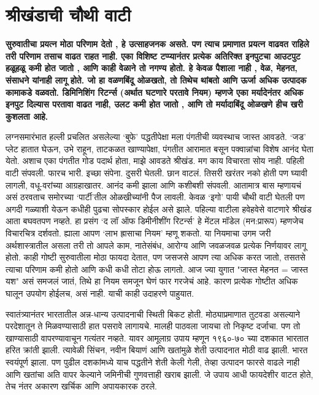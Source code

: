 \chapter{श्रीखंडाची चौथी वाटी}

\textcolor{blue!60!black}{\textbf{सुरुवातीचा प्रयत्न मोठा परिणाम देतो , हे उत्साहजनक असते. पण त्याच प्रमाणात प्रयत्न वाढवत राहिले तरी परिणाम तसाच वाढत राहत नाही. एका विशिष्ट टप्प्यानंतर प्रत्येक अतिरिक्त इनपुटचा आउटपुट हळूहळू कमी होत जातो , आणि काही वेळाने तो नगण्य होतो. हे केवळ पैशाला नाही , वेळ, मेहनत, संसाधने यांनाही लागू होते. जो हा वळणबिंदू ओळखतो, तो तिथेच थांबतो आणि ऊर्जा अधिक उत्पादक कामाकडे वळवतो. डिमिनिशिंग रिटर्न्स (अर्थात घटणारे परतावे नियम) म्हणजे एका मर्यादेनंतर अधिक इनपुट दिल्यास परतावा वाढत नाही, उलट कमी होत जातो , आणि तो मर्यादाबिंदू ओळखणे हीच खरी कुशलता आहे.}}

लग्नसमारंभात हल्ली प्रचलित असलेल्या ‘बुफे’ पद्धतीपेक्षा मला पंगतीची व्यवस्थाच जास्त आवडते. ‘जड’ प्लेट हातात घेऊन, उभे राहून, ताटकळत खाण्यापेक्षा, पंगतीत आरामात बसून पक्वान्नांचा विशेष आनंद घेता येतो. अशाच एका पंगतीत गोड पदार्थ होता, माझे आवडते श्रीखंड. मग काय विचारता सोय नाही. पहिली वाटी संपवली. फारच भारी. इच्छा संपेना. दुसरी घेतली. छान वाटलं. तिसरी खरंतर नको होती पण घ्यावी लागली, वधू-वरांच्या आग्रहाखातर. आनंद कमी झाला आणि कशीबशी संपवली. आतामात्र बास म्हणायचं असं  ठरवताच समोरच्या ‘पार्टी’तील ओळखीच्यांनी पैज लावली. केवळ ‘इगो’ पायी चौथी वाटी घेतली पण अगदी गळ्याशी येऊन कधीही पुढचा सोपस्कार होईल असे झाले. पहिल्या वाटीला हवेहवेसे वाटणारे श्रीखंड आता बघवतपण नव्हते. हा प्रसंग ‘द लॉ ऑफ डिमीनीशींग रिटर्न्स’ हे मेंटल मॉडेल (मन:प्रारूप) म्हणजेच विचारचित्र दर्शवतो. ह्याला आपण ‘लाभ ह्रासाचा नियम’ म्हणू शकतो. या नियमाचा उगम जरी अर्थशास्त्रातील असला तरी तो आपले काम, नातेसंबंध, आरोग्य आणि जवळजवळ प्रत्येक निर्णयावर लागू होतो. काही गोष्टी सुरुवातीला मोठा फायदा देतात, पण जसजसे आपण त्या अधिक करत जातो, तसतसे त्याचा परिणाम कमी होतो आणि कधी कधी तोटा होऊ लागतो. आज ज्या युगात "जास्त मेहनत = जास्त यश" असं समजलं जातं, तिथे हा नियम समजून घेणं फार गरजेचं आहे. कारण प्रत्येक गोष्टीत अधिक घालून उपयोग होईलच, असं नाही. याची काही उदाहरणे पाहुयात. 

स्वातंत्र्यानंतर भारतातील अन्न-धान्य उत्पादनाची स्थिती बिकट होती. मोठ्याप्रमाणात तुटवडा असल्याने परदेशातून ते मिळवण्यासाठी हात पसरावे लागायचे. मालही पाठवला जायचा तो निकृष्ट दर्जाचा. पण तो खाण्यासाठी वापरण्यावाचून गत्यंतर नव्हते. यावर आमूलाग्र उपाय म्हणून १९६०-७० च्या दशकात भारतात हरित क्रांती झाली. त्यावेळी सिंचन, नवीन बियाणं आणि खतांमुळे शेती उत्पादनात मोठी वाढ झाली. भारत स्वयंपूर्ण झाला. पण पुढील दशकांमध्ये याच पद्धतीने शेती केली गेली, तेव्हा उत्पादन फारसे वाढले नाही आणि खतांचा अति वापर केल्याने जमिनीची गुणवत्ताही खराब झाली. जे उपाय आधी फायदेशीर वाटत होते, तेच नंतर अकारण खर्चिक आणि अपायकारक ठरले.

